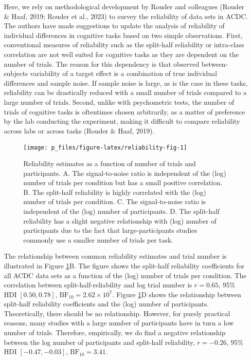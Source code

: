 \documentclass[
  man,floatsintext]{apa6}
\begin{document}
Here, we rely on methodological development by Rouder and colleagues (Rouder \& Haaf, 2019; Rouder et al., 2023) to survey the reliability of data sets in ACDC. The authors have made suggestions to update the analysis of reliability of individual differences in cognitive tasks based on two simple observations. First, conventional measures of reliability such as the split-half reliability or intra-class correlation are not well suited for cognitive tasks as they are dependent on the number of trials. The reason for this dependency is that observed between-subjects variability of a target effect is a combination of true individual differences and sample noise. If sample noise is large, as is the case in these tasks, reliability can be drastically reduced with a small number of trials compared to a large number of trials. Second, unlike with psychometric tests, the number of trials of cognitive tasks is oftentimes chosen arbitrarily, as a matter of preference by the lab conducting the experiment, making it difficult to compare reliability across labs or across tasks (Rouder \& Haaf, 2019).



\begin{figure}

{\centering \texttt{[image: p\_files/figure-latex/reliability-fig-1]} 

}

\caption{Reliability estimates as a function of number of trials and participants. A. The signal-to-noise ratio is independent of the (log) number of trials per condition but has a small positive correlation. B. The split-half reliability is highly correlated with the (log) number of trials per condition. C. The signal-to-noise ratio is independent of the (log) number of participants. D. The split-half reliability has a slight negative relationship with (log) number of participants due to the fact that large-participants studies commonly use a smaller number of trials per task.}\label{fig:reliability-fig}
\end{figure}

The relationship between common reliability estimates and trial number is illustrated in Figure \ref{fig:reliability-fig}B. The figure shows the split-half reliability coefficients for all ACDC data sets as a function of the (log) number of trials per condition. The correlation between split-half-reliability and log trial number is \(r = 0.65\), 95\% HDI \([0.50, 0.78]\), \(\mathrm{BF}_{\textrm{10}} = 2.62 \times 10^{7}\). Figure \ref{fig:reliability-fig}D shows the relationship between split-half reliability coefficients and the (log) number of participants. Theoretically, there should be no relationship. However, for purely practical reasons, many studies with a large number of participants have in turn a low number of trials. Therefore, empirically, we do find a negative relationship between the log number of participants and split-half reliability, \(r = -0.26\), 95\% HDI \([-0.47, -0.03]\), \(\mathrm{BF}_{\textrm{10}} = 3.41\).
\end{document}
